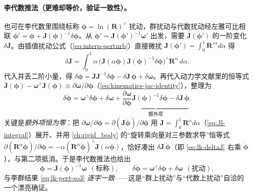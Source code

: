 \paragraph{李代数推法（更难却等价，验证一致性）。}也可在李代数里围绕标称 $\boldsymbol{\phi}=\ln(\mathbf{R})^\vee$ 扰动，群扰动与代数扰动经左雅可比相联 $\boldsymbol{\phi}'=\boldsymbol{\phi}+\mathbf{J}(\boldsymbol{\phi})^{-1}\delta\boldsymbol{\phi}$。从 $\dot{\boldsymbol{\phi}}'=\mathbf{J}(\boldsymbol{\phi}')^{-1}\boldsymbol{\omega}'$ 出发，需要 $\mathbf{J}(\boldsymbol{\phi}')$ 的一阶变化 $\delta\mathbf{J}$。由插值扰动公式（\cref{eq:interp-perturb}）直接微扰 $\mathbf{J}(\boldsymbol{\phi}')=\int_0^1\mathbf{R}'^{\alpha}d\alpha$ 得
\begin{equation}
  \delta\mathbf{J}=\int_0^1\alpha\,\big(\mathbf{J}(\alpha\boldsymbol{\phi})\mathbf{J}(\boldsymbol{\phi})^{-1}\delta\boldsymbol{\phi}\big)^\wedge\mathbf{R}^\alpha\,d\alpha.
  \label{eq:lk-deltaJ}
\end{equation}
代入并丢二阶小量，得 $\delta\dot{\boldsymbol{\phi}}=\dot{\mathbf{J}}\mathbf{J}^{-1}\delta\boldsymbol{\phi}-\delta\mathbf{J}\,\dot{\boldsymbol{\phi}}+\delta\boldsymbol{\omega}$。再代入动力学文献里的恒等式 $\dot{\mathbf{J}}(\boldsymbol{\phi})-\boldsymbol{\omega}^\wedge\mathbf{J}(\boldsymbol{\phi})\equiv\partial\boldsymbol{\omega}/\partial\boldsymbol{\phi}$（\cref{eq:kinematics-jac-identity}），整理为
\begin{equation}
  \delta\dot{\boldsymbol{\phi}}=\boldsymbol{\omega}^\wedge\delta\boldsymbol{\phi}+\delta\boldsymbol{\omega}
  +\underbrace{\frac{\partial\boldsymbol{\omega}}{\partial\boldsymbol{\phi}}\mathbf{J}(\boldsymbol{\phi})^{-1}\delta\boldsymbol{\phi}-\delta\mathbf{J}\,\dot{\boldsymbol{\phi}}}_{\text{额外项}}.
  \label{eq:lk-alg-extra}
\end{equation}
关键是\emph{额外项恒为零}：把 $\partial\boldsymbol{\omega}/\partial\boldsymbol{\phi}=\partial(\mathbf{J}\dot{\boldsymbol{\phi}})/\partial\boldsymbol{\phi}$ 用 $\mathbf{J}=\int_0^1\mathbf{R}^\alpha d\alpha$（\cref{eq:Jl-integral}）展开、并用 \cref{ch:rigid_body} 的“旋转乘向量对三参数求导”恒等式 $\partial(\mathbf{R}^\alpha\dot{\boldsymbol{\phi}})/\partial\boldsymbol{\phi}=-\alpha(\mathbf{R}^\alpha\dot{\boldsymbol{\phi}})^\wedge\mathbf{J}(\alpha\boldsymbol{\phi})$，恰好凑出 $\delta\mathbf{J}\,\dot{\boldsymbol{\phi}}$（即 \cref{eq:lk-deltaJ} 右乘 $\dot{\boldsymbol{\phi}}$），与第二项抵消\cite{barfoot2024state}。于是李代数推法也给出
\begin{equation}
  \dot{\boldsymbol{\phi}}=\mathbf{J}(\boldsymbol{\phi})^{-1}\boldsymbol{\omega}\ \ (\text{标称}),\qquad
  \delta\dot{\boldsymbol{\phi}}=\boldsymbol{\omega}^\wedge\delta\boldsymbol{\phi}+\delta\boldsymbol{\omega}\ \ (\text{扰动}),
  \label{eq:lk-alg-result}
\end{equation}
与李群结果 \cref{eq:lk-pert-so3} \emph{逐字一致}——这是“群上扰动”与“代数上扰动”自洽的一个漂亮确证。

